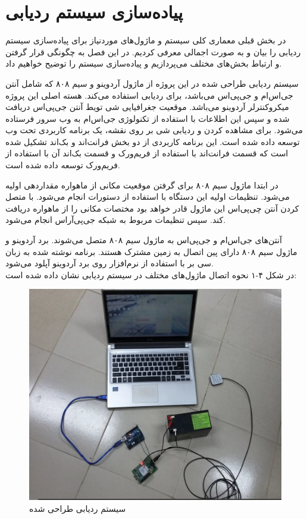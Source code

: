 \chapter{پیاده‌سازی سیستم ردیابی}
در بخش قبلی معماری کلی سیستم و ماژول‌های موردنیاز برای پیاده‌سازی سیستم ردیابی را بیان و به صورت اجمالی معرفی کردیم. در این فصل به چگونگی قرار گرفتن و ارتباط بخش‌های مختلف می‌پردازیم و پیاده‌سازی سیستم را توضیح خواهیم داد.


سیستم ردیابی طراحی شده در این پروژه از ماژول آردوینو و سیم ۸۰۸ که شامل آنتن جی‌اس‌ام و جی‌پی‌اس می‌باشد، برای ردیابی استفاده می‌کند. هسته اصلی این پروژه میکروکنترلر آردوینو می‌باشد. موقعیت جغرافیایی شی تویط آنتن جی‌پی‌اس دریافت شده و سپس این اطلاعات با استفاده از تکنولوژی جی‌اس‌ام به وب سرور فرستاده می‌شود. برای مشاهده کردن و ردیابی شی بر روی نقشه، یک برنامه کاربردی تحت وب توسعه داده شده است. 
این برنامه کاربردی از دو بخش فرانت‌اند و بک‌اند تشکیل شده است که قسمت فرانت‌اند با استفاده از فریم‌ورک  و قسمت بک‌اند آن با استفاده از فریم‌ورک  توسعه داده شده است.
 
 
در ابتدا ماژول سیم ۸۰۸ برای گرفتن موقعیت مکانی از ماهواره مقداردهی اولیه می‌شود. تنظیمات اولیه این دستگاه با استفاده از دستورات  انجام می‌شود. با متصل کردن آنتن چی‌پی‌اس این ماژول قادر خواهد بود مختصات مکانی را از ماهواره دریافت کند. سپس تنظیمات مربوط به شبکه جی‌پی‌آر‌اس انجام می‌شود.


آنتن‌های جی‌اس‌ام و جی‌پی‌اس به ماژول سیم ۸۰۸ متصل می‌شوند. برد آردوینو و ماژول سیم ۸۰۸ دارای پین اتصال به زمین مشترک هستند. برنامه نوشته شده به زبان سی بر با استفاده از نرم‌افزار  روی برد آردوینو آپلود می‌شود.
\\
\newpage
در شکل ۴-۱ نحوه اتصال ماژول‌های مختلف در سیستم ردیابی نشان داده شده است:
\begin{figure}[!h]
	\centerline{\includegraphics[width=.6\textwidth]{design-system}}
	\caption{سیستم ردیابی طراحی شده}
\end{figure}

